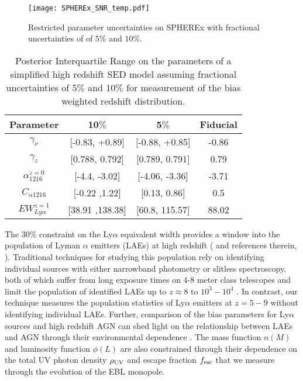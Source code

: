 \documentclass[fleqn,usenatbib]{mnras}
\begin{document}
\begin{figure}

\texttt{[image: SPHEREx\_SNR\_temp.pdf]}
\caption{\label{fig:SPHEREx_SED}Restricted parameter uncertainties on {\small SPHEREx} with fractional uncertainties of of $5\%$ and $10\%$.}
\end{figure}

\begin{table}
  \begin{center}
      \caption{Posterior Interquartile Range on the parameters of a simplified high redshift SED model assuming fractional uncertainties of 5$\%$ and 10$\%$ for measurement of the bias weighted redshift distribution.\label{tab:table3}}
    \begin{tabular}{c c c c}
    
      \textbf{Parameter} & \textbf{10$\%$} & \textbf{5$\%$} & \textbf{Fiducial}\\
      \hline
      $\gamma_{\nu}$ & [-0.83, +0.89] & [-0.88, +0.85] & -0.86\\ %
      $\gamma_{z}$ & [0.788, 0.792] & [0.789, 0.791] & 0.79\\ %
      $\alpha_{1216}^{z=0}$ &  [-4.4, -3.02] & [-4.06, -3.36] & -3.71\\
      $C_{\alpha 1216}$ & [-0.22 ,1.22]&[0.13, 0.86] & 0.5\\
      $EW_{Ly\alpha}^{z=1}$ &[38.91 ,138.38] & [60.8, 115.57] & 88.02\\
    \end{tabular}
  \end{center}
\end{table}



The 30$\%$ constraint on the Ly$\alpha$ equivalent width provides a window into the population of Lyman $\alpha$ emitters (LAEs) at high redshift (\citealt{Ouchi2019} and references therein, \citealt{1967ApJ...147..868P}). Traditional techniques for studying this population rely on identifying individual sources with either narrowband photometry or slitless spectroscopy, both of which suffer from long exposure times on 4-8 meter class telescopes and limit the population of identified LAEs up to  $z\approx 8$ to $10^3-10^4$ \citep{Konno2016}. In contrast, our technique measures the population statistics of Ly$\alpha$ emitters at $z=5-9$ without identifying individual LAEs. Further, comparison of the bias parameters for Ly$\alpha$ sources and high redshift AGN can shed light on the relationship between LAEs and AGN through their environmental dependence \citep{Coil_2009,Sheth_1999}. The mass function $n(M)$ and luminosity function $\phi(L)$ are also constrained through their dependence on the total UV photon density $\rho_{\rm UV}$ and escape fraction $f_{\rm esc}$ that we measure through the evolution of the EBL monopole.
\end{document}
